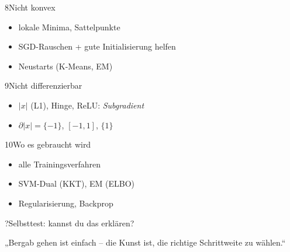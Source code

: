 \begin{hngrid}
%
\begin{hnp}[raster multicolumn=2,acc=hngreen]{8}{Nicht konvex}
\begin{itemize}
\item lokale Minima, Sattelpunkte
\item SGD-Rauschen + gute Initialisierung helfen
\item Neustarts (K-Means, EM)
\end{itemize}
\end{hnp}
%
\begin{hnp}[raster multicolumn=2,acc=hnred]{9}{Nicht differenzierbar}
\begin{itemize}
\item $|x|$ (L1), Hinge, ReLU: \emph{Subgradient}
\item $\partial|x|=\{-1\}$, $[-1,1]$, $\{1\}$
\end{itemize}
\end{hnp}
%
\begin{hnp}[raster multicolumn=2,acc=hnorange]{10}{Wo es gebraucht wird}
\begin{itemize}
\item alle Trainingsverfahren
\item SVM-Dual (KKT), EM (ELBO)
\item Regularisierung, Backprop
\end{itemize}
\end{hnp}
%
\begin{hnp}[raster multicolumn=6,acc=hnpurple,colback=hnlilac!30]{?}{Selbsttest: kannst du das erklären?}
\end{hnp}
%
\begin{hnbanner}[raster multicolumn=6]
„Bergab gehen ist einfach -- die Kunst ist, die richtige Schrittweite zu wählen.“
\end{hnbanner}
\end{hngrid}
